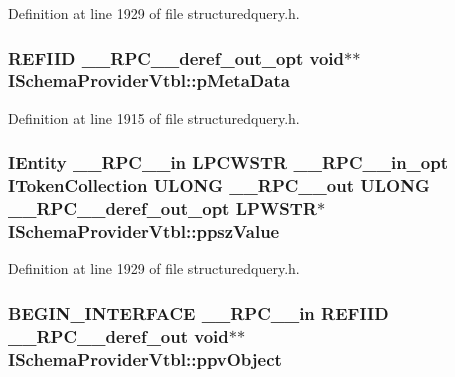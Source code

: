 Definition at line 1929 of file structuredquery.\+h.

\subsubsection[{\texorpdfstring{p\+Meta\+Data}{pMetaData}}]{ {\bf R\+E\+F\+I\+ID} {\bf \+\_\+\+\_\+\+R\+P\+C\+\_\+\+\_\+deref\+\_\+out\+\_\+opt} {\bf void}$\ast$$\ast$ I\+Schema\+Provider\+Vtbl\+::p\+Meta\+Data}\hypertarget{struct_i_schema_provider_vtbl_a5fe80c28fbdc73c19b251eedeb220b7e}{}\label{struct_i_schema_provider_vtbl_a5fe80c28fbdc73c19b251eedeb220b7e}


Definition at line 1915 of file structuredquery.\+h.

\subsubsection[{\texorpdfstring{ppsz\+Value}{ppszValue}}]{ {\bf I\+Entity} {\bf \+\_\+\+\_\+\+R\+P\+C\+\_\+\+\_\+in} {\bf L\+P\+C\+W\+S\+TR} {\bf \+\_\+\+\_\+\+R\+P\+C\+\_\+\+\_\+in\+\_\+opt} {\bf I\+Token\+Collection} {\bf U\+L\+O\+NG} {\bf \+\_\+\+\_\+\+R\+P\+C\+\_\+\+\_\+out} {\bf U\+L\+O\+NG} {\bf \+\_\+\+\_\+\+R\+P\+C\+\_\+\+\_\+deref\+\_\+out\+\_\+opt} {\bf L\+P\+W\+S\+TR}$\ast$ I\+Schema\+Provider\+Vtbl\+::ppsz\+Value}\hypertarget{struct_i_schema_provider_vtbl_aff64775e56a90217abf80ea4ba57fcd7}{}\label{struct_i_schema_provider_vtbl_aff64775e56a90217abf80ea4ba57fcd7}


Definition at line 1929 of file structuredquery.\+h.

\subsubsection[{\texorpdfstring{ppv\+Object}{ppvObject}}]{\setlength{\rightskip}{0pt plus 5cm}B\+E\+G\+I\+N\+\_\+\+I\+N\+T\+E\+R\+F\+A\+CE {\bf \+\_\+\+\_\+\+R\+P\+C\+\_\+\+\_\+in} {\bf R\+E\+F\+I\+ID} {\bf \+\_\+\+\_\+\+R\+P\+C\+\_\+\+\_\+deref\+\_\+out} {\bf void}$\ast$$\ast$ I\+Schema\+Provider\+Vtbl\+::ppv\+Object}\hypertarget{struct_i_schema_provider_vtbl_a9911f9c2c659cd367b857be6a3c7b009}{}\label{struct_i_schema_provider_vtbl_a9911f9c2c659cd367b857be6a3c7b009}


